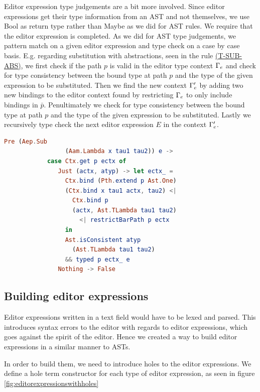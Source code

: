 Editor expression type judgements are a bit more involved. Since
editor expressions get their type information from an AST and not
themselves, we use Bool as return type rather than Maybe as we did for
AST rules. We require that the editor expression is completed. As we
did for AST type judgements, we pattern match on a given editor
expression and type check on a case by case basis.  E.g. regarding
substitution with abstractions, seen in the rule
\hyperref[fig:edttyperules]{(T-SUB-ABS)}, we first check if the path $p$ is
valid in the editor type context $\Gamma_{e}$ and check for type consistency
between the bound type at path $p$ and the type of the given expression to be
substituted. Then we find the new context $\Gamma_{e}'$ by adding two new bindings
to the editor context found by restricting $\Gamma_{e}$ to only include bindings
in $\bar{p}$. Penultimately we check for type consistency between the bound
type at path $p$ and the type of the given expression to be substituted. Lastly
we recursively type check the next editor expression $E$ in the context
$\Gamma_{e}'$.
\begin{lstlisting}[language=elm,%
                    gobble=8,%
                    mathescape,%
                    ]
        Pre (Aep.Sub
                 (Aam.Lambda x tau1 tau2)) e ->
            case Ctx.get p ectx of
               Just (actx, atyp) -> let ectx_ =
                 Ctx.bind (Pth.extend p Ast.One)
                 (Ctx.bind x tau1 actx, tau2) <|
                   Ctx.bind p
                   (actx, Ast.TLambda tau1 tau2)
                     <| restrictBarPath p ectx
                 in
                 Ast.isConsistent atyp
                   (Ast.TLambda tau1 tau2)
                 && typed p ectx_ e
               Nothing -> False
\end{lstlisting}

\subsection{Building editor expressions}
Editor expressions written in a text field would have to be lexed and parsed.
This introduces syntax errors to the editor with regards to editor expressions,
which goes against the spirit of the editor. Hence we created a way to
build editor expressions in a similar manner to ASTs.

In order to build them, we need to introduce holes to the editor
expressions. We define a hole term constructor for each type of editor
expression, as seen in figure \ref{fig:editorexpressionswithholes}

